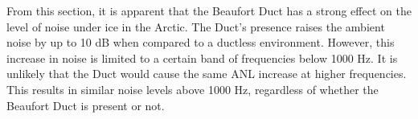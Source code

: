 From this section, it is apparent that the Beaufort Duct has a strong effect on the level of noise under ice in the Arctic. The Duct's presence raises the ambient noise by up to 10 dB when compared to a ductless environment. However, this increase in noise is limited to a certain band of frequencies below 1000 Hz. It is unlikely that the Duct would cause the same ANL increase at higher frequencies. This results in similar noise levels above 1000 Hz, regardless of whether the Beaufort Duct is present or not.

